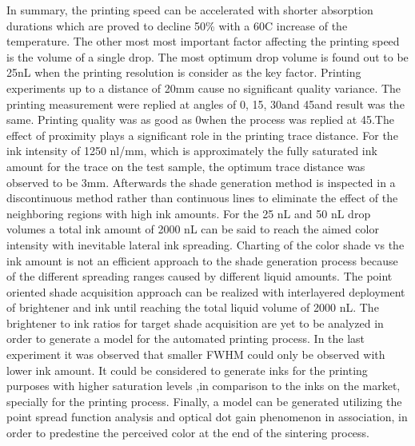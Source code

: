In summary, the printing speed can be accelerated with shorter absorption durations which are proved to decline 50\% with a 60\textdegree C increase of the temperature. The other most most important factor affecting the printing speed is the volume of a single drop. The most optimum drop volume is found out to be 25nL when the printing resolution is consider as the key factor. Printing experiments up to a distance of 20mm cause no significant quality variance. The printing measurement were replied at angles of 0\textdegree \space, 15\textdegree \space, 30\textdegree \space and 45\textdegree \space and result was the same. Printing quality was as good as 0\textdegree \space  when the process was replied at 45\textdegree \space .The effect of proximity plays a significant role in the printing trace distance. For the ink intensity of 1250 nl/mm, which is approximately the fully saturated ink amount for the trace on the test sample, the optimum trace distance  was observed to be 3mm. Afterwards the shade generation method is inspected in a discontinuous method rather than continuous lines to eliminate the effect of the neighboring regions with high ink amounts. For the 25 nL and 50 nL drop volumes a total ink amount of 2000 nL can be said to reach the aimed color intensity with inevitable lateral ink spreading. Charting of the color shade vs the ink amount is not an efficient approach to the shade generation process because of the different spreading ranges caused by different liquid amounts. The point oriented shade acquisition approach can be realized with interlayered deployment of brightener and ink until reaching the total liquid volume of 2000 nL. The brightener to ink ratios for target shade acquisition are yet to be analyzed in order to generate a model for the automated printing process. In the last experiment it was observed that smaller FWHM could only be observed with lower ink amount. It could be considered to generate inks for the printing purposes with higher saturation levels ,in comparison to the inks on the market, specially for the printing process. Finally, a model can be generated utilizing the point spread function analysis and optical dot gain phenomenon in association, in order to predestine the perceived color at the end of the sintering process. 